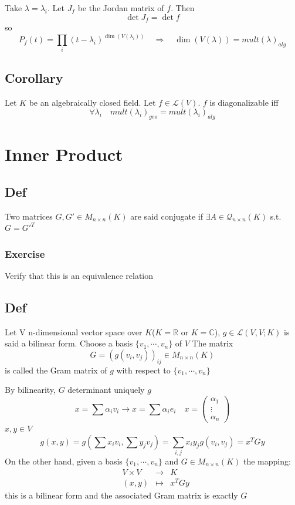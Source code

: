 \documentclass{book}
\begin{document}
Take $\lambda=\lambda_i$. Let $J_f$ be the Jordan matrix of $f$. Then $$\det J_f=\det f$$
so 
$$P_f(t)=\prod\limits_i(t-\lambda_i)^{\dim (V(\lambda_i))}\quad\Rightarrow\quad \dim(V(\lambda))=mult(\lambda)_{alg}$$
\section{Corollary}
Let $K$ be an algebraically closed field. Let $f\in \mathscr{L}(V)$. $f$ is diagonalizable iff $$\forall\lambda_i\quad mult(\lambda_i)_{geo}=mult(\lambda_i)_{alg}$$
\chapter{Inner Product}
\newcommand{\inprod}[2]{\left<#1,#2\right>}
\section{Def}Two matrices $G,G'\in M_{n\times n}(K)$ are said conjugate if $\exists A\in \mathcal{Q}_{n\times n}(K)$ s.t. $G=G'^T$
\subsection*{Exercise}
Verify that this is an equivalence relation
\section{Def}
Let V n-dimensional vector space over $K$($K=\mathbb{R}$ or $K=\mathbb{C}$), $g\in \mathscr{L}(V,V;K)$ is said a bilinear form. Choose a basis $\{v_1,\cdots,v_n\}$ of $V$ The matrix $$G=(g(v_i,v_j))_{ij}\in M_{n\times n}(K)$$ is called the Gram matrix of $g$ with respect to $\{v_1,\cdots,v_n\}$

By bilinearity, $G$ determinant uniquely $g$$$x=\sum\alpha_iv_i\rightarrow x=\sum\alpha_ie_i\quad x=\begin{pmatrix}
    \alpha_1\\\vdots\\\alpha_n
\end{pmatrix}$$
$x,y\in V$
$$g(x,y)=g(\sum x_iv_i,\sum y_jv_j)=\sum\limits_{i,j}x_iy_jg(v_i,v_j)=x^TGy$$
On the other hand, given a basis $\{v_1,\cdots,v_n\}$ and $G\in M_{n\times n}(K)$ the mapping:
$$\begin{aligned}
    &V\times V &\rightarrow &K\\
    &(x,y)&\mapsto &x^TGy
\end{aligned}$$
this is a bilinear form and the associated Gram matrix is exactly $G$
\end{document}
